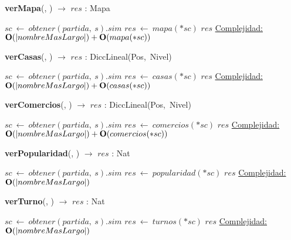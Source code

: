 \begin{Algoritmos}
    \begin{algorithm}[H]{\textbf{verMapa}(, ) $\to$ $res$ : Mapa}
    \begin{algorithmic}[1]
        \State $sc\ \leftarrow\ obtener(partida,\ s).sim$
        \State $res\ \leftarrow\ mapa(*sc)$ 
        \State \Return $res$
        \medskip
        \Statex \underline{Complejidad:} $\bold{O}(|nombreMasLargo|) + \bold{O}(mapa(*sc))$
    \end{algorithmic}
    \end{algorithm}
      
    \begin{algorithm}[H]{\textbf{verCasas}(, ) $\to$ $res$ : DiccLineal(Pos,\ Nivel)}
    \begin{algorithmic}[1]
        \State $sc\ \leftarrow\ obtener(partida,\ s).sim$
        \State $res\ \leftarrow\ casas(*sc)$
        \State \Return $res$
        \medskip
        \Statex \underline{Complejidad:} $\bold{O}(|nombreMasLargo|) + \bold{O}(casas(*sc))$
    \end{algorithmic}
    \end{algorithm}

    \begin{algorithm}[H]{\textbf{verComercios}(, ) $\to$ $res$ : DiccLineal(Pos,\ Nivel)}
    \begin{algorithmic}[1]
        \State $sc\ \leftarrow\ obtener(partida,\ s).sim$
        \State $res\ \leftarrow\ comercios(*sc)$
        \State \Return $res$
        \medskip
        \Statex \underline{Complejidad:} $\bold{O}(|nombreMasLargo|) + \bold{O}(comercios(*sc))$
    \end{algorithmic}
    \end{algorithm}

    \begin{algorithm}[H]{\textbf{verPopularidad}(, ) $\to$ $res$ : Nat}
    \begin{algorithmic}[1]
        \State $sc\ \leftarrow\ obtener(partida,\ s).sim$
        \State $res\ \leftarrow\ popularidad(*sc)$
        \State \Return $res$
        \medskip
        \Statex \underline{Complejidad:} $\bold{O}(|nombreMasLargo|)$
    \end{algorithmic}
    \end{algorithm}

    \begin{algorithm}[H]{\textbf{verTurno}(, ) $\to$ $res$ : Nat}
    \begin{algorithmic}[1]
        \State $sc\ \leftarrow\ obtener(partida,\ s).sim$
        \State $res\ \leftarrow\ turnos(*sc)$
        \State \Return $res$
        \medskip
        \Statex \underline{Complejidad:} $\bold{O}(|nombreMasLargo|)$
    \end{algorithmic}
    \end{algorithm}

\end{Algoritmos}
